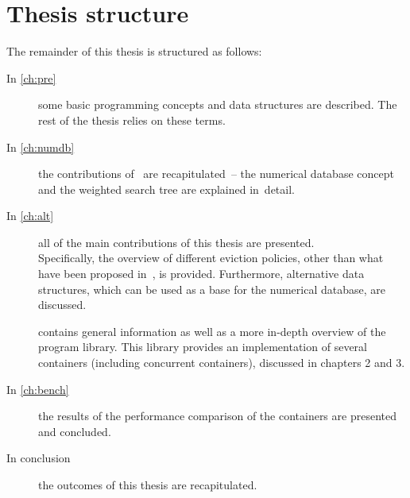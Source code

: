 \section{Thesis structure}
The remainder of this thesis is structured as follows:
 \begin{description}
 \item[In \cref{ch:pre}] some basic programming concepts and data structures are described. The rest of the thesis relies on these terms.
 \item[In \cref{ch:numdb}] the contributions of~\cite{park90} are recapitulated~-- the numerical database concept and the weighted search tree are explained in~detail.
 \item[In \cref{ch:alt}] all of the main contributions of this thesis are presented. \\ Specifically, the overview of different eviction policies, other than what have been proposed in~\cite{park90}, is provided. Furthermore, alternative data structures, which can be used as a base for the numerical database, are discussed.

 \item [] contains general information as well as a more in-depth overview of the \numdbname{} program library. This library provides an implementation of several containers (including concurrent containers), discussed in chapters 2 and 3.

 \item [In \cref{ch:bench}] the results of the performance comparison of the containers are presented and concluded.

 \item [In conclusion] the outcomes of this thesis are recapitulated.

\end{description}
